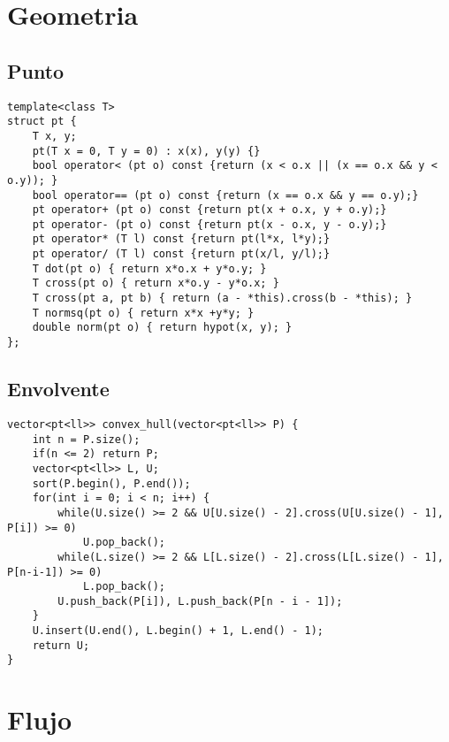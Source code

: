 \documentclass[twocolumn]{article}
\begin{document}
\section{Geometria}
\subsection{Punto}
\lstset{basicstyle=\footnotesize\ttfamily,breaklines=true,tabsize=2,language=C++,frame=leftline, numbers=left, numberstyle=\tiny, numbersep=5pt}
\begin{lstlisting}
template<class T>
struct pt {
	T x, y;
	pt(T x = 0, T y = 0) : x(x), y(y) {}
	bool operator< (pt o) const {return (x < o.x || (x == o.x && y < o.y)); }
	bool operator== (pt o) const {return (x == o.x && y == o.y);}
	pt operator+ (pt o) const {return pt(x + o.x, y + o.y);}
	pt operator- (pt o) const {return pt(x - o.x, y - o.y);}
	pt operator* (T l) const {return pt(l*x, l*y);}
	pt operator/ (T l) const {return pt(x/l, y/l);}
	T dot(pt o) { return x*o.x + y*o.y; }
	T cross(pt o) { return x*o.y - y*o.x; }
	T cross(pt a, pt b) { return (a - *this).cross(b - *this); }
	T normsq(pt o) { return x*x +y*y; }
	double norm(pt o) { return hypot(x, y); }
};
\end{lstlisting}
\subsection{Envolvente}
\lstset{basicstyle=\footnotesize\ttfamily,breaklines=true,tabsize=2,language=C++,frame=leftline, numbers=left, numberstyle=\tiny, numbersep=5pt}
\begin{lstlisting}
vector<pt<ll>> convex_hull(vector<pt<ll>> P) {
	int n = P.size();
	if(n <= 2) return P;
	vector<pt<ll>> L, U;
	sort(P.begin(), P.end());
	for(int i = 0; i < n; i++) {
		while(U.size() >= 2 && U[U.size() - 2].cross(U[U.size() - 1], P[i]) >= 0)
			U.pop_back();
		while(L.size() >= 2 && L[L.size() - 2].cross(L[L.size() - 1], P[n-i-1]) >= 0)
			L.pop_back();
		U.push_back(P[i]), L.push_back(P[n - i - 1]);
	}
	U.insert(U.end(), L.begin() + 1, L.end() - 1);
	return U;
}
\end{lstlisting}
\section{Flujo}
\end{document}
